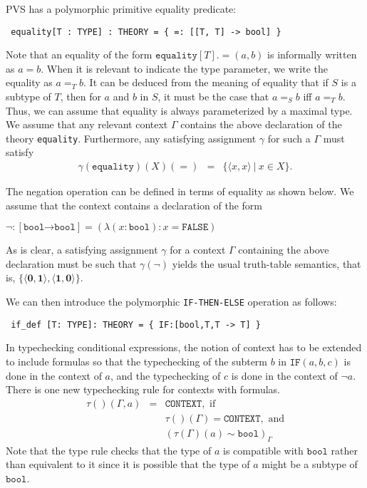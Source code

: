 \documentclass [12pt,twoside]{cslreport}
\newcommand{\aro}{\mathord\rightarrow} %
\newcommand{\pair}[1]{\langle #1 \rangle}
\newcommand{\funtype}[2]{[#1 \aro #2]}
\newcommand{\oneb}{\mathbf{1}}
\newcommand{\zerob}{\mathbf{0}}
\newcommand{\ttbool}{\mathtt{bool}}
\newcommand{\ttfalse}{\mathtt{FALSE}}
\newcommand{\ttcontext}{\mathtt{CONTEXT}}
\newcommand{\vbar}{\ |\ }
\newenvironment{display}{\begin{alltt}\small\tt\vspace{0.3\baselineskip}}{\vspace{0.3\baselineskip}\end{alltt}}
\begin{document}
PVS has a polymorphic primitive equality predicate:
\begin{display}
equality[T : TYPE] : THEORY = \{ =: [[T, T] -> bool] \}
\end{display}
Note that an equality of the form $ \mathtt{equality}[T].\mathtt{=}(a, b)$ is
informally written as $a = b$\@.  When it is relevant to indicate the type
parameter, we write the equality as $a =_{T} b$\@.  It can be deduced from
the meaning of equality that if $S$ is a subtype of $T$, then for $a$ and
$b$ in $S$, it must be the case that $a =_{S} b$ iff $a =_{T} b$\@.  Thus,
we can assume that equality is always parameterized by a maximal type.  We
assume that any relevant context $\Gamma$ contains the above declaration
of the theory {\tt equality}.  Furthermore, any satisfying assignment
$\gamma$ for such a $\Gamma$ must satisfy
\begin{eqnarray*}
\gamma( \mathtt{ equality})(X)(=) &  = & \{\pair{x, x}\vbar x\in X\}.
\end{eqnarray*}

The negation operation can be defined in terms of equality as shown below.
We assume that the context contains a declaration of the form
\begin{alltt}
   \(\neg : \funtype{\ttbool}{\ttbool} = (\lambda (x : \ttbool): x = \ttfalse)\)
\end{alltt}

As is clear, a satisfying assignment $\gamma$ for a context $\Gamma$
containing the above declaration must be such that $\gamma(\neg)$ yields
the usual truth-table semantics, that is, 
$\{ \pair{\zerob, \oneb}, \pair{\oneb, \zerob} \}$\@.  

We can then introduce the polymorphic \texttt{IF-THEN-ELSE} operation
as follows: 
\begin{display}
if_def [T: TYPE]: THEORY = \{ IF:[bool,T,T -> T] \}
\end{display}

In typechecking conditional expressions, the notion of context
has to be extended to include formulas so that the typechecking
of the subterm $b$ in $\mathtt{IF}(a, b, c)$ is done in the context of $a$,
and the typechecking of $c$ is done in the context of $\neg a$\@.
There is one new typechecking rule for contexts with formulas.
\begin{eqnarray*}
\tau()(\Gamma, a) & = & \ttcontext, \mbox{ if}\\
& & \tau()(\Gamma) = \ttcontext, \mbox{ and} \\
& & (\tau(\Gamma)(a)   \sim \ttbool)_\Gamma
\end{eqnarray*}
Note that the type rule checks that the type of $a$ is compatible with
$\ttbool$ rather than equivalent to it since it is possible that the  type
of $a$ might be a subtype of $\ttbool$\@.  
\end{document}
